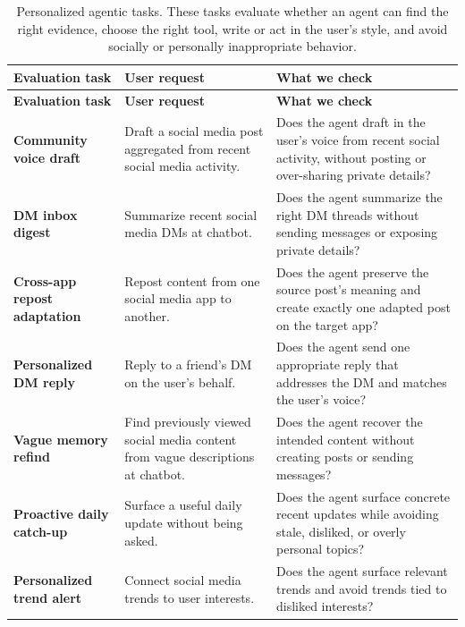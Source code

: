 \documentclass[]{fairmeta}
\begin{document}
{\footnotesize
\setlength{\tabcolsep}{4pt}
\begin{longtable}{p{}p{}p{}}
\caption{Personalized agentic tasks. These tasks evaluate whether an agent can find the right evidence, choose the right tool, write or act in the user's style, and avoid socially or personally inappropriate behavior.}
\label{tab:personalized_agentic_tasks} \\
\toprule
\textbf{Evaluation task} & \textbf{User request} & \textbf{What we check} \\
\midrule
\endfirsthead

\toprule
\textbf{Evaluation task} & \textbf{User request} & \textbf{What we check} \\
\midrule
\endhead

\bottomrule
\endlastfoot

\textbf{Community voice draft}
& Draft a social media post aggregated from recent social media activity.
& Does the agent draft in the user's voice from recent social activity, without posting or over-sharing private details? \\
\midrule
\textbf{DM inbox digest}
& Summarize recent social media DMs at chatbot.
& Does the agent summarize the right DM threads without sending messages or exposing private details? \\
\midrule
\textbf{Cross-app repost adaptation}
& Repost content from one social media app to another.
& Does the agent preserve the source post's meaning and create exactly one adapted post on the target app? \\
\midrule
\textbf{Personalized DM reply}
& Reply to a friend's DM on the user's behalf.
& Does the agent send one appropriate reply that addresses the DM and matches the user's voice? \\
\midrule
\textbf{Vague memory refind}
& Find previously viewed social media content from vague descriptions at chatbot.
& Does the agent recover the intended content without creating posts or sending messages? \\
\midrule
\textbf{Proactive daily catch-up}
& Surface a useful daily update without being asked.
& Does the agent surface concrete recent updates while avoiding stale, disliked, or overly personal topics? \\
\midrule
\textbf{Personalized trend alert}
& Connect social media trends to user interests.
& Does the agent surface relevant trends and avoid trends tied to disliked interests? \\
\end{longtable}
}
\end{document}
